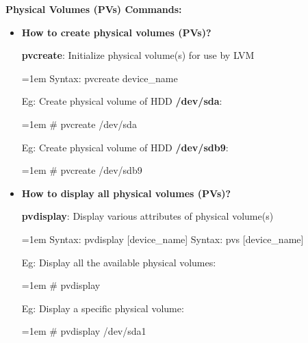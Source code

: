 \setlength{\columnsep}{3pt}
\begin{flushleft}
	
		\bigskip
	
		\textbf{Physical Volumes (PVs) Commands:}
		
		\begin{itemize}
			\item 		\textbf{How to create physical volumes (PVs)?}
			
			\textbf{pvcreate}: Initialize physical volume(s) for use by LVM
			\begin{tcolorbox}[breakable,notitle,boxrule=-0pt,colback=pink,colframe=pink]
				\color{black}
				\font=1em
				Syntax: pvcreate device\_name
				\font=4pt
			\end{tcolorbox}
			
			
			Eg: Create physical volume of HDD \textbf{/dev/sda}:
			\begin{tcolorbox}[breakable,notitle,boxrule=-0pt,colback=black,colframe=black]
				\color{green}
				\font=1em
				\# pvcreate /dev/sda
				\font=4pt
			\end{tcolorbox}
			
			Eg: Create physical volume of HDD \textbf{/dev/sdb9}:
			\begin{tcolorbox}[breakable,notitle,boxrule=-0pt,colback=black,colframe=black]
				\color{green}
				\font=1em
				\# pvcreate /dev/sdb9
				\font=4pt
			\end{tcolorbox}
			
		\end{itemize}
	
	
	\bigskip
	\bigskip
	\begin{itemize}
		\item 	\textbf{How to display all physical volumes (PVs)?}
		
		\textbf{pvdisplay}: Display various attributes of physical volume(s)
		\begin{tcolorbox}[breakable,notitle,boxrule=-0pt,colback=pink,colframe=pink]
			\color{black}
			\font=1em
			Syntax: pvdisplay [device\_name]
			\newline
			Syntax: pvs [device\_name]
			\font=4pt
		\end{tcolorbox}
		
		Eg: Display all the available physical volumes:
		\begin{tcolorbox}[breakable,notitle,boxrule=-0pt,colback=black,colframe=black]
			\color{green}
			\font=1em
			\# pvdisplay
			\font=4pt
		\end{tcolorbox}
		Eg: Display a specific physical volume:
		\begin{tcolorbox}[breakable,notitle,boxrule=-0pt,colback=black,colframe=black]
			\color{green}
			\font=1em
			\# pvdisplay /dev/sda1
			\font=4pt
		\end{tcolorbox}
	

\end{itemize}
\end{flushleft}
